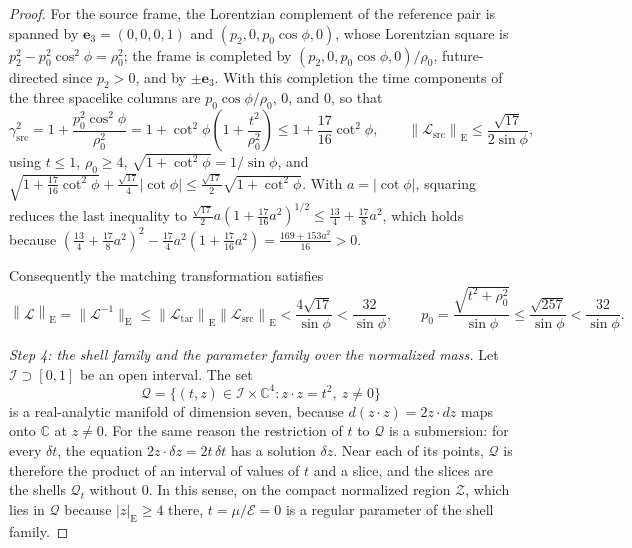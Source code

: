 \documentclass[11pt]{amsart}
\numberwithin{equation}{section}
\theoremstyle{definition}
\newcommand{\C}{\mathbb C}
\newcommand{\Energy}{\mathcal E}
\newcommand{\norm}[1]{\left\|#1\right\|}
\begin{document}
\begin{proof}
For the source frame, the Lorentzian complement of the reference pair is
spanned by \(\mathbf e_3=(0,0,0,1)\) and \((p_2,0,p_0\cos\phi,0)\), whose
Lorentzian square is \(p_2^2-p_0^2\cos^2\phi=\rho_0^2\); the frame is
completed by \((p_2,0,p_0\cos\phi,0)/\rho_0\), future-directed since
\(p_2>0\), and by \(\pm\mathbf e_3\). With this completion the time
components of the three spacelike
columns are \(p_0\cos\phi/\rho_0\), \(0\), and \(0\), so that
\[
 \gamma_{\mathrm{src}}^2
 =1+\frac{p_0^2\cos^2\phi}{\rho_0^2}
 =1+\cot^2\phi\left(1+\frac{t^2}{\rho_0^2}\right)
 \le1+\frac{17}{16}\cot^2\phi,\qquad
 \norm{\mathcal L_{\mathrm{src}}}_{\mathrm E}
 \le\frac{\sqrt{17}}{2\sin\phi},
\]
using \(t\le1\), \(\rho_0\ge4\), \(\sqrt{1+\cot^2\phi}=1/{\sin\phi}\), and
\(\sqrt{1+\tfrac{17}{16}\cot^2\phi}+\tfrac{\sqrt{17}}4\lvert\cot\phi\rvert
\le\tfrac{\sqrt{17}}2\sqrt{1+\cot^2\phi}\). With \(a=\lvert\cot\phi\rvert\), squaring
reduces the last inequality to
\(\tfrac{\sqrt{17}}2a(1+\tfrac{17}{16}a^2)^{1/2}\le\tfrac{13}4+\tfrac{17}8a^2\),
which holds because
\((\tfrac{13}4+\tfrac{17}8a^2)^2-\tfrac{17}4a^2(1+\tfrac{17}{16}a^2)
=\tfrac{169+153a^2}{16}>0\).

Consequently the matching transformation satisfies
\[
 \norm{\mathcal L}_{\mathrm E}
 =\lVert\mathcal L^{-1}\rVert_{\mathrm E}
 \le\norm{\mathcal L_{\mathrm{tar}}}_{\mathrm E}
   \norm{\mathcal L_{\mathrm{src}}}_{\mathrm E}
 <\frac{4\sqrt{17}}{\sin\phi}
 <\frac{32}{\sin\phi},
 \qquad
 p_0=\frac{\sqrt{t^2+\rho_0^2}}{\sin\phi}
 \le\frac{\sqrt{257}}{\sin\phi}
 <\frac{32}{\sin\phi}.
\]

\smallskip
\emph{Step 4: the shell family and the parameter family over the
normalized mass.} Let \(\mathcal I\supset[0,1]\) be an open interval. The
set
\[
 \mathcal Q=\{(t,z)\in\mathcal I\times\C^4:z\cdot z=t^2,\ z\ne0\}
\]
is a real-analytic manifold of dimension seven, because
\(d(z\cdot z)=2z\cdot dz\) maps onto \(\C\) at \(z\ne0\). For the same reason
the restriction of \(t\) to \(\mathcal Q\) is a submersion: for every
\(\delta t\), the equation \(2z\cdot\delta z=2t\,\delta t\) has a solution
\(\delta z\). Near each of its points, \(\mathcal Q\) is therefore the
product of an interval of values of \(t\) and a slice, and the slices are
the shells \(\mathcal Q_t\) without \(0\). In this sense, on the compact
normalized region \(\mathscr Z\), which lies in \(\mathcal Q\) because
\(|z|_{\mathrm E}\ge4\) there, \(t=\mu/\Energy=0\) is a regular parameter of
the shell family.


\end{proof}
\end{document}
